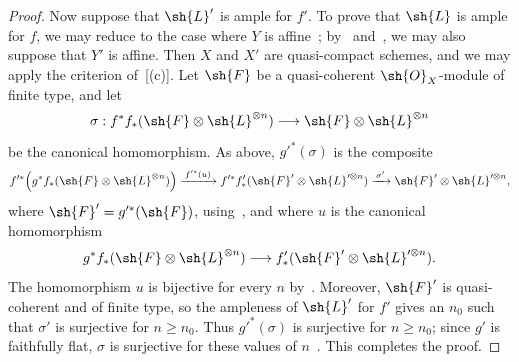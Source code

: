 \begin{proof}
Now suppose that $\sh{L}'$ is ample for $f'$. To prove that $\sh{L}$
is ample for $f$, we may reduce to the case where $Y$ is
affine~; by~
and~, we may also suppose that $Y'$ is affine.
Then $X$ and $X'$ are quasi-compact schemes, and we may apply the
criterion of~[(c)]. Let $\sh{F}$ be a
quasi-coherent $\sh{O}_X$-module of finite type, and let
\[
  \sigma:
  f^*f_*(\sh{F}\otimes\sh{L}^{\otimes n})
  \longrightarrow
  \sh{F}\otimes\sh{L}^{\otimes n}
\]
be the canonical homomorphism. As above, $g'^*(\sigma)$ is the
composite
\[
  f'^*\!\left(g^*f_*(\sh{F}\otimes\sh{L}^{\otimes n})\right)
    \xrightarrow{\,f'^*(u)\,}
  f'^*f'_*(\sh{F}'\otimes\sh{L}'^{\otimes n})
    \xrightarrow{\,\sigma'\,}
  \sh{F}'\otimes\sh{L}'^{\otimes n},
\]
where $\sh{F}'=g'^*(\sh{F})$, using~, and where
$u$ is the canonical homomorphism
\[
  g^*f_*(\sh{F}\otimes\sh{L}^{\otimes n})
  \longrightarrow
  f'_*(\sh{F}'\otimes\sh{L}'^{\otimes n}).
\]
The homomorphism $u$ is bijective for every $n$ by~.
Moreover, $\sh{F}'$ is quasi-coherent and of finite type, so the
ampleness of $\sh{L}'$ for $f'$ gives an $n_0$ such that $\sigma'$ is
surjective for $n\geq n_0$. Thus $g'^*(\sigma)$ is surjective for
$n\geq n_0$; since $g'$ is faithfully flat, $\sigma$ is surjective for
these values of $n$~. This completes the proof.
\end{proof}


